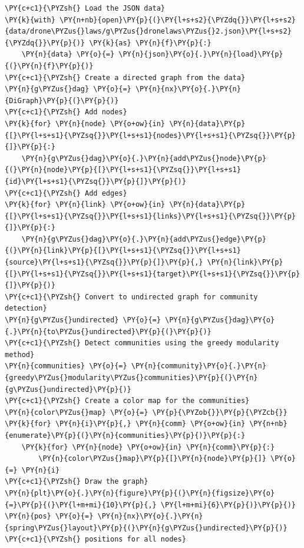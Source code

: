     \begin{tcolorbox}[breakable, size=fbox, boxrule=1pt, pad at break*=1mm,colback=cellbackground, colframe=cellborder]
\begin{Verbatim}[commandchars=\\\{\}]
\PY{c+c1}{\PYZsh{} Load the JSON data}
\PY{k}{with} \PY{n+nb}{open}\PY{p}{(}\PY{l+s+s2}{\PYZdq{}}\PY{l+s+s2}{data/drone\PYZus{}laws/g\PYZus{}dronelaws\PYZus{}2.json}\PY{l+s+s2}{\PYZdq{}}\PY{p}{)} \PY{k}{as} \PY{n}{f}\PY{p}{:}
    \PY{n}{data} \PY{o}{=} \PY{n}{json}\PY{o}{.}\PY{n}{load}\PY{p}{(}\PY{n}{f}\PY{p}{)}
\PY{c+c1}{\PYZsh{} Create a directed graph from the data}
\PY{n}{g\PYZus{}dag} \PY{o}{=} \PY{n}{nx}\PY{o}{.}\PY{n}{DiGraph}\PY{p}{(}\PY{p}{)}
\PY{c+c1}{\PYZsh{} Add nodes}
\PY{k}{for} \PY{n}{node} \PY{o+ow}{in} \PY{n}{data}\PY{p}{[}\PY{l+s+s1}{\PYZsq{}}\PY{l+s+s1}{nodes}\PY{l+s+s1}{\PYZsq{}}\PY{p}{]}\PY{p}{:}
    \PY{n}{g\PYZus{}dag}\PY{o}{.}\PY{n}{add\PYZus{}node}\PY{p}{(}\PY{n}{node}\PY{p}{[}\PY{l+s+s1}{\PYZsq{}}\PY{l+s+s1}{id}\PY{l+s+s1}{\PYZsq{}}\PY{p}{]}\PY{p}{)}
\PY{c+c1}{\PYZsh{} Add edges}
\PY{k}{for} \PY{n}{link} \PY{o+ow}{in} \PY{n}{data}\PY{p}{[}\PY{l+s+s1}{\PYZsq{}}\PY{l+s+s1}{links}\PY{l+s+s1}{\PYZsq{}}\PY{p}{]}\PY{p}{:}
    \PY{n}{g\PYZus{}dag}\PY{o}{.}\PY{n}{add\PYZus{}edge}\PY{p}{(}\PY{n}{link}\PY{p}{[}\PY{l+s+s1}{\PYZsq{}}\PY{l+s+s1}{source}\PY{l+s+s1}{\PYZsq{}}\PY{p}{]}\PY{p}{,} \PY{n}{link}\PY{p}{[}\PY{l+s+s1}{\PYZsq{}}\PY{l+s+s1}{target}\PY{l+s+s1}{\PYZsq{}}\PY{p}{]}\PY{p}{)}
\PY{c+c1}{\PYZsh{} Convert to undirected graph for community detection}
\PY{n}{g\PYZus{}undirected} \PY{o}{=} \PY{n}{g\PYZus{}dag}\PY{o}{.}\PY{n}{to\PYZus{}undirected}\PY{p}{(}\PY{p}{)}
\PY{c+c1}{\PYZsh{} Detect communities using the greedy modularity method}
\PY{n}{communities} \PY{o}{=} \PY{n}{community}\PY{o}{.}\PY{n}{greedy\PYZus{}modularity\PYZus{}communities}\PY{p}{(}\PY{n}{g\PYZus{}undirected}\PY{p}{)}
\PY{c+c1}{\PYZsh{} Create a color map for the communities}
\PY{n}{color\PYZus{}map} \PY{o}{=} \PY{p}{\PYZob{}}\PY{p}{\PYZcb{}}
\PY{k}{for} \PY{n}{i}\PY{p}{,} \PY{n}{comm} \PY{o+ow}{in} \PY{n+nb}{enumerate}\PY{p}{(}\PY{n}{communities}\PY{p}{)}\PY{p}{:}
    \PY{k}{for} \PY{n}{node} \PY{o+ow}{in} \PY{n}{comm}\PY{p}{:}
        \PY{n}{color\PYZus{}map}\PY{p}{[}\PY{n}{node}\PY{p}{]} \PY{o}{=} \PY{n}{i}
\PY{c+c1}{\PYZsh{} Draw the graph}
\PY{n}{plt}\PY{o}{.}\PY{n}{figure}\PY{p}{(}\PY{n}{figsize}\PY{o}{=}\PY{p}{(}\PY{l+m+mi}{10}\PY{p}{,} \PY{l+m+mi}{6}\PY{p}{)}\PY{p}{)}
\PY{n}{pos} \PY{o}{=} \PY{n}{nx}\PY{o}{.}\PY{n}{spring\PYZus{}layout}\PY{p}{(}\PY{n}{g\PYZus{}undirected}\PY{p}{)}  \PY{c+c1}{\PYZsh{} positions for all nodes}

\end{Verbatim}
\end{tcolorbox}

